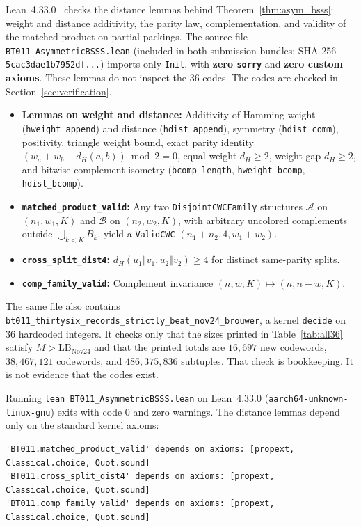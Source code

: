 \documentclass[11pt,letterpaper]{article}
\theoremstyle{plain}
\theoremstyle{definition}
\theoremstyle{remark}
\begin{document}
Lean~4.33.0~\cite{deMouraUllrich2021Lean4} checks the distance lemmas behind Theorem~\ref{thm:asym_bsss}: weight and distance additivity, the parity law, complementation, and validity of the matched product on partial packings. The source file \texttt{BT011\_AsymmetricBSSS.lean} (included in both submission bundles; SHA-256 \texttt{5cac3dae1b7952df...}) imports only \texttt{Init}, with \textbf{zero \texttt{sorry}} and \textbf{zero custom axioms}. These lemmas do not inspect the $36$ codes. The codes are checked in Section~\ref{sec:verification}.
\begin{itemize}[leftmargin=1.5em,itemsep=1.5pt]
    \item \textbf{Lemmas on weight and distance:} Additivity of Hamming weight (\texttt{hweight\_\allowbreak append}) and distance (\texttt{hdist\_\allowbreak append}), symmetry (\texttt{hdist\_\allowbreak comm}), positivity, triangle weight bound, exact parity identity $(w_a + w_b + d_H(a,b)) \bmod 2 = 0$, equal-weight $d_H \ge 2$, weight-gap $d_H \ge 2$, and bitwise complement isometry (\texttt{bcomp\_length}, \texttt{hweight\_bcomp}, \texttt{hdist\_bcomp}).
    \item \textbf{\texttt{matched\_product\_valid}:} Any two \texttt{DisjointCWCFamily} structures $\mathcal{A}$ on $(n_1, w_1, K)$ and $\mathcal{B}$ on $(n_2, w_2, K)$, with arbitrary uncolored complements outside $\bigcup_{k<K} B_k$, yield a \texttt{ValidCWC} $(n_1 + n_2, 4, w_1 + w_2)$.
    \item \textbf{\texttt{cross\_split\_dist4}:} $d_H(u_1 \mathbin{\Vert} v_1, u_2 \mathbin{\Vert} v_2) \ge 4$ for distinct same-parity splits.
    \item \textbf{\texttt{comp\_family\_valid}:} Complement invariance $(n, w, K) \mapsto (n, n-w, K)$.
\end{itemize}
The same file also contains \texttt{bt011\_thirtysix\_records\_strictly\_beat\_nov24\_brouwer}, a kernel \texttt{decide} on $36$ hardcoded integers. It checks only that the sizes printed in Table~\ref{tab:all36} satisfy $M > \mathrm{LB}_{\mathrm{Nov24}}$ and that the printed totals are $16{,}697$ new codewords, $38{,}467{,}121$ codewords, and $486{,}375{,}836$ subtuples. That check is bookkeeping. It is not evidence that the codes exist.

Running \texttt{lean BT011\_AsymmetricBSSS.lean} on Lean~4.33.0 (\texttt{aarch64-unknown-linux-gnu}) exits with code $0$ and zero warnings. The distance lemmas depend only on the standard kernel axioms:
\begin{lstlisting}
'BT011.matched_product_valid' depends on axioms: [propext, Classical.choice, Quot.sound]
'BT011.cross_split_dist4' depends on axioms: [propext, Classical.choice, Quot.sound]
'BT011.comp_family_valid' depends on axioms: [propext, Classical.choice, Quot.sound]
\end{lstlisting}
\end{document}
